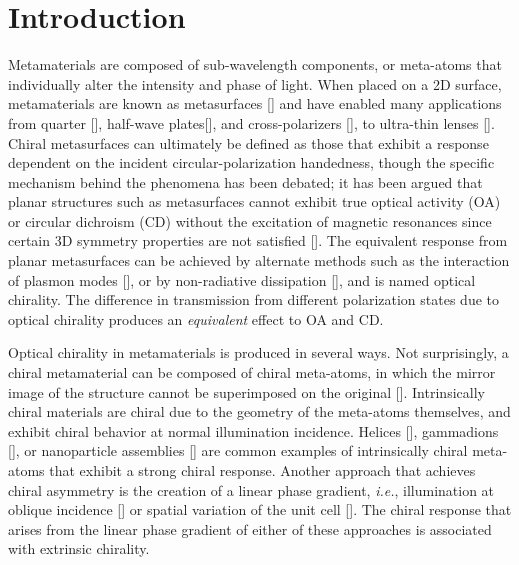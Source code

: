 \section{Introduction} 
Metamaterials are composed of sub-wavelength components, or meta-atoms that individually alter the intensity and phase of light. When placed on a 2D surface, metamaterials are known as metasurfaces [\cite{Zhao}] and have enabled many applications from quarter [\cite{Yu}], half-wave plates[\cite{Ding}], and cross-polarizers [\cite{Qin}], to ultra-thin lenses [\cite{Aieta,Ni}]. Chiral metasurfaces can ultimately be defined as those that exhibit a response dependent on the incident circular-polarization handedness, though the specific mechanism behind the phenomena has been debated; it has been argued that planar structures such as metasurfaces cannot exhibit true optical activity (OA) or circular dichroism (CD) without the excitation of magnetic resonances since certain 3D symmetry properties are not satisfied [\cite{Hentschel, Eftekhari}]. The equivalent response from planar metasurfaces can be achieved by alternate methods such as the interaction of plasmon modes [\cite{Eftekhari, Fan10}], or by non-radiative dissipation [\cite{Khanikaev}], and is named optical chirality. The difference in transmission from different polarization states due to optical chirality produces an \textit{equivalent} effect to OA and CD. 	

Optical chirality in metamaterials is produced in several ways. Not surprisingly, a chiral metamaterial can be composed of chiral meta-atoms, in which the mirror image of the structure cannot be superimposed on the original [\cite{Zhang:14, Tang2016}]. Intrinsically chiral materials are chiral due to the geometry of the meta-atoms themselves, and exhibit chiral behavior at normal illumination incidence. Helices [\cite{Kuzyk}], gammadions [\cite{Cao13, Kwon08}], or nanoparticle assemblies [\cite{FanSci, Guerrero-Martinez}] are common examples of intrinsically chiral meta-atoms that exhibit a strong chiral response. Another approach that achieves chiral asymmetry is the creation of a linear phase gradient, {\it i.e.}, illumination at oblique incidence [\cite{Yannopapas,Cao, Cao15, Cao15_2, Proscia}] or spatial variation of the unit cell [\cite{Aieta, Yu,Shaltout}]. The chiral response that arises from the linear phase gradient of either of these approaches is associated with extrinsic chirality.  

